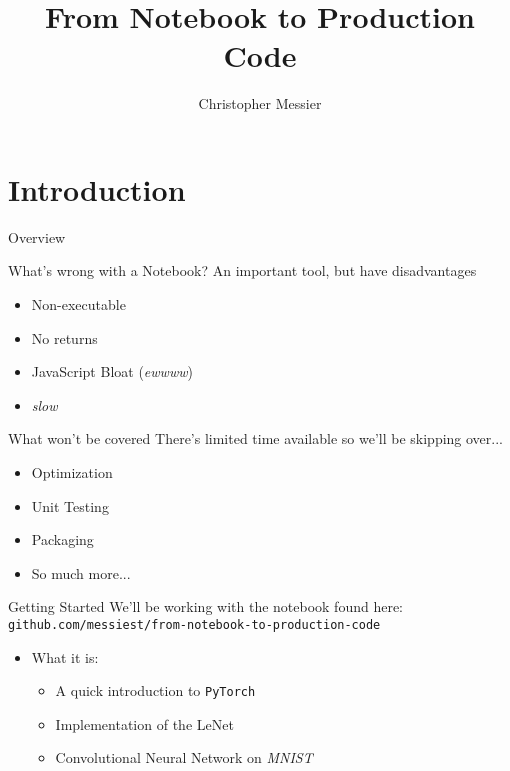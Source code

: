 \documentclass[12pt,t]{beamer}
\title[FNTPC]{From Notebook to Production Code}
\author[Messier]{Christopher Messier}
\institute[DSI-DC]{General Assembly\\Washington, DC}
\begin{document}
\linespread{1.5}

\begin{frame}
	\titlepage
\end{frame}


\section{Introduction}

\begin{frame}{Overview}
	\tableofcontents
\end{frame}

\begin{frame}{What's wrong with a Notebook?}
	An important tool, but have disadvantages
	\begin{itemize}
		\item Non-executable
		\item No returns
		\item JavaScript Bloat (\emph{ewwww})
		\item \emph{slow}
	\end{itemize}
\end{frame}

\begin{frame}{What won't be covered}
	There's limited time available so we'll be skipping over...
    \begin{itemize}
	    \item Optimization
	    \item Unit Testing
		\item Packaging
		\item So much more...
	\end{itemize}
\end{frame}

\begin{frame}{Getting Started}
	We'll be working with the notebook found here:
	\small{\texttt{github.com/messiest/from-notebook-to-production-code}}
	\begin{itemize}
		\item What it is:
		\begin{itemize}
			\item A quick introduction to \texttt{PyTorch}
			\item Implementation of the LeNet
			\item Convolutional Neural Network on \emph{MNIST}
		\end{itemize}
	\end{itemize}
\end{frame}
\end{document}
